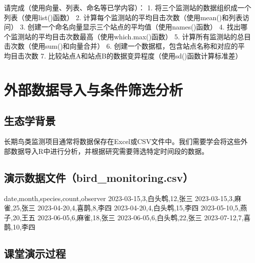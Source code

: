 \documentclass[
]{book}
\newenvironment{Shaded}{\begin{snugshade}}{\end{snugshade}}
\newcommand{\NormalTok}[1]{#1}
\begin{document}
请完成（使用向量、列表、命名等已学内容）：
1. 将三个监测站的数据组织成一个列表（使用list()函数）
2. 计算每个监测站的平均目击次数（使用mean()和列表访问）
3. 创建一个命名向量显示三个站点的平均值（使用names()函数）
4. 找出哪个监测站的平均目击次数最高（使用which.max()函数）
5. 计算所有监测站的总目击次数（使用sum()和向量合并）
6. 创建一个数据框，包含站点名称和对应的平均目击次数
7. 比较站点A和站点B的数据变异程度（使用sd()函数计算标准差）

\hypertarget{ux5916ux90e8ux6570ux636eux5bfcux5165ux4e0eux6761ux4ef6ux7b5bux9009ux5206ux6790}{%
\section{外部数据导入与条件筛选分析}\label{ux5916ux90e8ux6570ux636eux5bfcux5165ux4e0eux6761ux4ef6ux7b5bux9009ux5206ux6790}}

\hypertarget{ux751fux6001ux5b66ux80ccux666f-4}{%
\subsection{生态学背景}\label{ux751fux6001ux5b66ux80ccux666f-4}}

长期鸟类监测项目通常将数据保存在Excel或CSV文件中。我们需要学会将这些外部数据导入R中进行分析，并根据研究需要筛选特定时间段的数据。

\hypertarget{ux6f14ux793aux6570ux636eux6587ux4ef6bird_monitoring.csv}{%
\subsection{演示数据文件（bird\_monitoring.csv）}\label{ux6f14ux793aux6570ux636eux6587ux4ef6bird_monitoring.csv}}

\begin{Shaded}
\begin{Highlighting}[]
\NormalTok{date,month,species,count,observer}
\NormalTok{2023{-}03{-}15,3,白头鹎,12,张三}
\NormalTok{2023{-}03{-}15,3,麻雀,25,张三}
\NormalTok{2023{-}04{-}20,4,喜鹊,8,李四}
\NormalTok{2023{-}04{-}20,4,白头鹎,15,李四}
\NormalTok{2023{-}05{-}10,5,燕子,20,王五}
\NormalTok{2023{-}06{-}05,6,麻雀,18,张三}
\NormalTok{2023{-}06{-}05,6,白头鹎,22,张三}
\NormalTok{2023{-}07{-}12,7,喜鹊,10,李四}
\end{Highlighting}
\end{Shaded}

\hypertarget{ux8bfeux5802ux6f14ux793aux8fc7ux7a0b-4}{%
\subsection{课堂演示过程}\label{ux8bfeux5802ux6f14ux793aux8fc7ux7a0b-4}}
\end{document}
